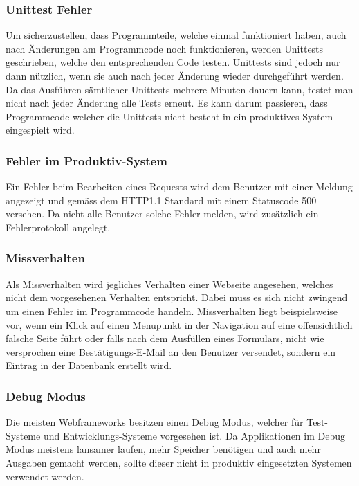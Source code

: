 \subsubsection{Unittest Fehler}
\label{ssub:unittestfehler}
Um sicherzustellen, dass Programmteile, welche einmal funktioniert haben, auch nach Änderungen am Programmcode noch funktionieren, werden Unittests geschrieben, welche den entsprechenden Code testen. Unittests sind jedoch nur dann nützlich, wenn sie auch nach jeder Änderung wieder durchgeführt werden. Da das Ausführen sämtlicher Unittests mehrere Minuten dauern kann, testet man nicht nach jeder Änderung alle Tests erneut. Es kann darum passieren, dass Programmcode welcher die Unittests nicht besteht in ein produktives System eingespielt wird.

\subsubsection{Fehler im Produktiv-System}
\label{ssub:fehlerimproduktivsystem}
Ein Fehler beim Bearbeiten eines Requests wird dem Benutzer mit einer Meldung angezeigt und gemäss dem HTTP1.1\cite{rfc2616} Standard mit einem Statuscode 500 versehen. Da nicht alle Benutzer solche Fehler melden, wird zusätzlich ein Fehlerprotokoll angelegt.

\subsubsection{Missverhalten}
\label{ssub:missverhalten}
Als Missverhalten wird jegliches Verhalten einer Webseite angesehen, welches nicht dem vorgesehenen Verhalten entspricht. Dabei muss es sich nicht zwingend um einen Fehler im Programmcode handeln. Missverhalten liegt beispielsweise vor, wenn ein Klick auf einen Menupunkt in der Navigation auf eine offensichtlich falsche Seite führt oder falls nach dem Ausfüllen eines Formulars, nicht wie versprochen eine Bestätigungs-E-Mail an den Benutzer versendet, sondern ein Eintrag in der Datenbank erstellt wird.

\subsubsection{Debug Modus}
\label{ssub:debugmodus}
Die meisten Webframeworks besitzen einen Debug Modus, welcher für Test-Systeme und Entwicklungs-Systeme vorgesehen ist. Da Applikationen im Debug Modus meistens lansamer laufen, mehr Speicher benötigen und auch mehr Ausgaben gemacht werden, sollte dieser nicht in produktiv eingesetzten Systemen verwendet werden.

